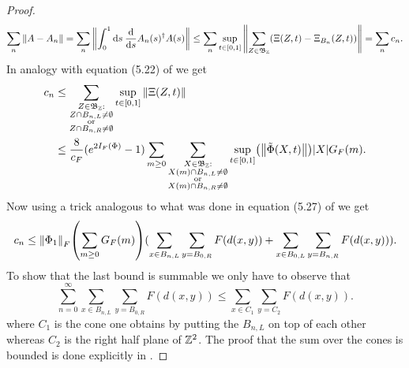 \documentclass[11pt,a4paper,twoside]{article}
\numberwithin{equation}{section}
\begin{document}
{\begin{proof}
\begin{equation}
			\sum_n\norm{A-A_n}=\sum_n\norm{\int_0^1\text{d} s\: \frac{\text{d}}{\text{d} s}A_{n}(s)^\dagger A(s)}\leq \sum_n \sup_{t\in[0,1]}\norm{\sum_{Z\in\mathfrak{B}_\mathbb Z}(\Xi(Z,t)-\Xi_{B_n}(Z,t))}=\sum_n c_n.
		\end{equation}
		In analogy with equation (5.22) of \cite{ogata2021h3gmathbb} we get
		\begin{align}
			\label{eq:c_n_Bound1D}
			c_n&\leq \sum_{\substack{Z\in\mathfrak{B}_{\ZZ}:\\Z\cap B_{n,L}\neq\emptyset\\\text{or}\\Z\cap B_{n,R}\neq\emptyset}}\sup_{t\in[0,1]}\norm{\Xi(Z,t)}\\
			&\leq \frac{8}{c_F}(e^{2I_F(\Phi)}-1) \sum_{m\geq 0}\sum_{\substack{X\in\mathfrak{B}_{\ZZ}:\\X(m)\cap B_{n,L}\neq\emptyset\\\text{or}\\X(m)\cap B_{n,R}\neq\emptyset}}\sup_{t\in[0,1]}\left(\norm{\tilde{\Phi}(X,t)}\right)\abs{X}G_F(m).
		\end{align}
		Now using a trick analogous to what was done in equation (5.27) of \cite{ogata2021h3gmathbb} we get
		\begin{equation}
			c_n\leq \norm{\Phi_1}_F\left(\sum_{m\geq 0}G_F(m)\right)(\sum_{x\in B_{n,L}}\sum_{y=B_{0,R}}F(d(x,y))+\sum_{x\in B_{0,L}}\sum_{y=B_{n,R}}F(d(x,y))).
		\end{equation}
		To show that the last bound is summable we only have to observe that
		\begin{equation}
			\sum_{n=0}^\infty\sum_{x\in B_{n,L}}\sum_{y=B_{0,R}}F(d(x,y))\leq \sum_{x\in C_1}\sum_{y=C_2}F(d(x,y)).
		\end{equation}
		where $C_1$ is the cone one obtains by putting the $B_{n,L}$ on top of each other whereas $C_2$ is the right half plane of $\mathbb Z^2$. The proof that the sum over the cones is bounded is done explicitly in \cite{ogata2021h3gmathbb}.
	\end{proof}
}
\end{document}
